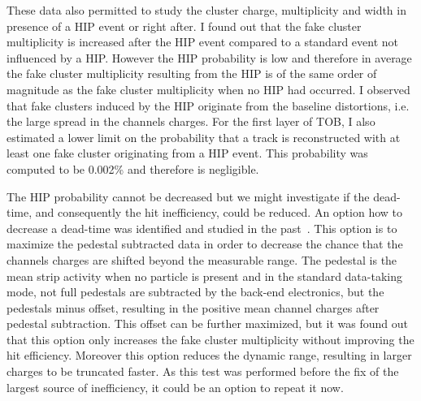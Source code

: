 These data also permitted to study the cluster charge, multiplicity and width  in presence of a HIP event or right after. I found out that the fake cluster multiplicity is increased after the HIP event compared to a standard event not influenced by a HIP. However the HIP probability is low and therefore in average the fake cluster multiplicity resulting from the HIP is of the same order of magnitude as the fake cluster multiplicity when no HIP had occurred. I observed that fake clusters induced by the HIP originate from the baseline distortions, i.e. the large spread in the channels charges. For the first layer of TOB, I also estimated a lower limit on the probability that a track is reconstructed with at least one fake cluster originating from a HIP event. This probability was computed to be 0.002\% and therefore is negligible.
 


The HIP probability cannot be decreased but we might investigate if the dead-time, and consequently the hit inefficiency, could be reduced. An option how to decrease a dead-time was identified and studied in the past~\cite{website:hitLoss}. This option is to maximize the pedestal subtracted data in order to decrease the chance that the channels charges are shifted beyond the measurable range. The pedestal is the mean strip activity when no particle is present and in the standard data-taking mode, not full pedestals are subtracted by the back-end electronics, but the pedestals minus offset, resulting in the positive mean channel charges after pedestal subtraction. This offset can be further maximized, but it was found out that this option only increases the fake cluster multiplicity without improving the hit efficiency. Moreover this option reduces the dynamic range, resulting in larger charges to be truncated faster. As this test was performed before the fix of the largest source of inefficiency, it could be an option to repeat it  now.

